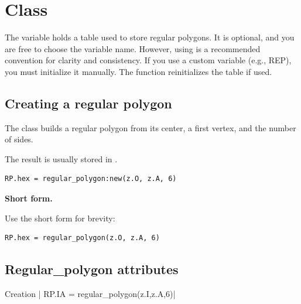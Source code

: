\newpage
\section{Class }

The variable  holds a table used to store regular polygons. It is optional, and you are free to choose the variable name. However, using  is a recommended convention for clarity and consistency. If you use a custom variable (e.g., REP), you must initialize it manually. The  function reinitializes the  table if used.


\subsection{Creating a regular polygon}

The  class builds a regular polygon from its center, a first vertex, and the number of sides.

\medskip
The result is usually stored in .

\begin{mybox}
\begin{verbatim}
RP.hex = regular_polygon:new(z.O, z.A, 6)
\end{verbatim}
\end{mybox}

\textbf{Short form.}

Use the short form for brevity:

\begin{mybox}
\begin{verbatim}
RP.hex = regular_polygon(z.O, z.A, 6)
\end{verbatim}
\end{mybox}

\subsection{Regular\_polygon attributes}
\label{sub:regular_polygon_attributes}

\begin{mybox}
Creation | RP.IA = regular_polygon(z.I,z.A,6)|
\end{mybox}


